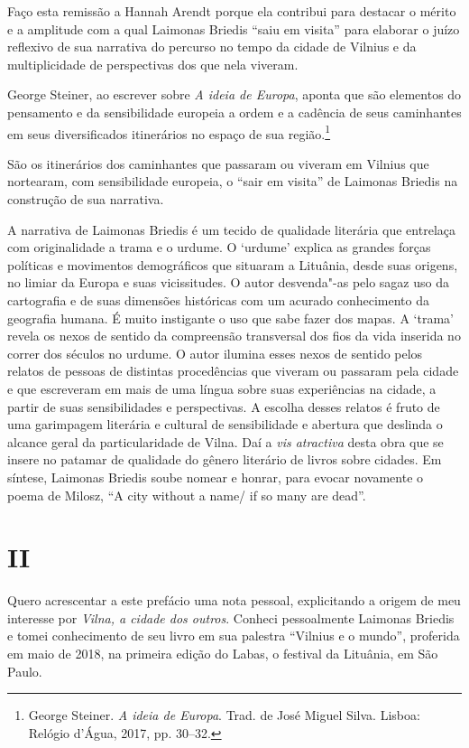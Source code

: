 Faço esta remissão a Hannah Arendt porque ela contribui para destacar o
mérito e a amplitude com a qual Laimonas Briedis ``saiu em visita'' para
elaborar o juízo reflexivo de sua narrativa do percurso no tempo da
cidade de Vilnius e da multiplicidade de perspectivas dos que nela
viveram.

George Steiner, ao escrever sobre \emph{A ideia de Europa}, aponta que
são elementos do pensamento e da sensibilidade europeia a ordem e a
cadência de seus caminhantes em seus diversificados itinerários no
espaço de sua região.\footnote{George Steiner. \emph{A ideia de Europa}.
  Trad. de José Miguel Silva. Lisboa: Relógio d'Água, 2017, pp. 30--32.}

São os itinerários dos caminhantes que passaram ou viveram em Vilnius
que nortearam, com sensibilidade europeia, o ``sair em visita'' de
Laimonas Briedis na construção de sua narrativa.

A narrativa de Laimonas Briedis é um tecido de qualidade literária que
entrelaça com originalidade a trama e o urdume. O `urdume' explica as
grandes forças políticas e movimentos demográficos que situaram a
Lituânia, desde suas origens, no limiar da Europa e suas vicissitudes. O
autor desvenda"-as pelo sagaz uso da cartografia e de suas dimensões
históricas com um acurado conhecimento da geografia humana. É muito
instigante o uso que sabe fazer dos mapas. A `trama' revela os nexos de
sentido da compreensão transversal dos fios da vida inserida no correr
dos séculos no urdume. O autor ilumina esses nexos de sentido pelos
relatos de pessoas de distintas procedências que viveram ou passaram
pela cidade e que escreveram em mais de uma língua sobre suas
experiências na cidade, a partir de suas sensibilidades e perspectivas.
A escolha desses relatos é fruto de uma garimpagem literária e cultural
de sensibilidade e abertura que deslinda o alcance geral da
particularidade de Vilna. Daí a \emph{vis atractiva} desta obra que se
insere no patamar de qualidade do gênero literário de livros sobre
cidades. Em síntese, Laimonas Briedis soube nomear e honrar, para evocar
novamente o poema de Milosz, ``A city without a name/ if so many are
dead''.

\section*{II}

Quero acrescentar a este prefácio uma nota pessoal, explicitando a
origem de meu interesse por \emph{Vilna, a cidade dos outros}. Conheci
pessoalmente Laimonas Briedis e tomei conhecimento de seu livro em sua
palestra ``Vilnius e o mundo'', proferida em maio de 2018, na primeira
edição do Labas, o festival da Lituânia, em São Paulo.

